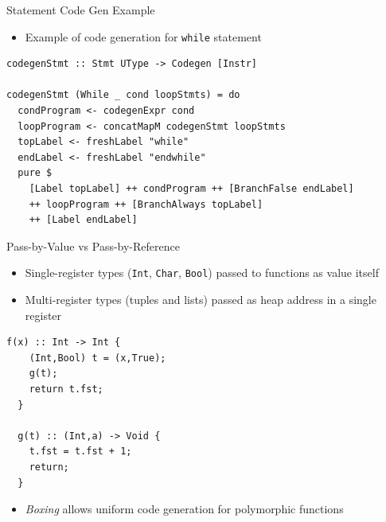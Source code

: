 \documentclass[dvipsnames,aspectratio=169]{beamer}
\begin{document}
\begin{frame}[fragile]{Statement Code Gen Example}

  \begin{itemize}
    \item Example of code generation for \texttt{while} statement
  \end{itemize}

\begin{verbatim}
codegenStmt :: Stmt UType -> Codegen [Instr]

codegenStmt (While _ cond loopStmts) = do
  condProgram <- codegenExpr cond
  loopProgram <- concatMapM codegenStmt loopStmts
  topLabel <- freshLabel "while"
  endLabel <- freshLabel "endwhile"
  pure $
    [Label topLabel] ++ condProgram ++ [BranchFalse endLabel]
    ++ loopProgram ++ [BranchAlways topLabel]
    ++ [Label endLabel]
\end{verbatim}

\end{frame}


\begin{frame}[fragile]{Pass-by-Value vs Pass-by-Reference}

  \begin{itemize}
    \item Single-register types (\texttt{Int}, \texttt{Char}, \texttt{Bool})
          passed to functions as value itself
    \item Multi-register types (tuples and lists) passed as heap address
          in a single register
  \end{itemize}

\begin{lstlisting}[language=spl]
  f(x) :: Int -> Int {
    (Int,Bool) t = (x,True);
    g(t);
    return t.fst;
  }

  g(t) :: (Int,a) -> Void {
    t.fst = t.fst + 1;
    return;
  }
\end{lstlisting}\vspace{-6mm}
%
\begin{itemize}
  \item \emph{Boxing} allows uniform code generation for polymorphic functions
\end{itemize}

\end{frame}


\end{document}

